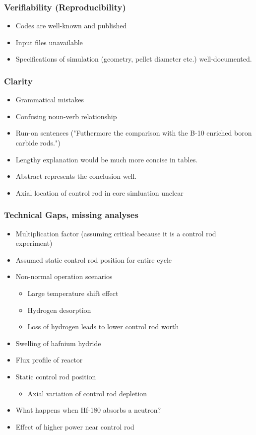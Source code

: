 \documentclass[9pt]{beamer}
\begin{document}
\begin{frame}
\frametitle{Verifiability (Reproducibility)}
\begin{itemize}
  \item Codes are well-known and published
  \item Input files unavailable
  \item Specifications of simulation (geometry, pellet diameter etc.) well-documented.
\end{itemize}
\end{frame}


\begin{frame}
\frametitle{Clarity}
\begin{itemize}
  \item Grammatical mistakes 
  \item Confusing noun-verb relationship
  \item Run-on sentences ("Futhermore the comparison with the B-10 enriched boron carbide rods.")
  \item Lengthy explanation would be much more concise in tables.
  \item Abstract represents the conclusion well.
  \item Axial location of control rod in core simluation unclear
\end{itemize}
\end{frame}


\begin{frame}
\frametitle{Technical Gaps, missing analyses}
\begin{itemize}
    \item Multiplication factor (assuming critical because it is a control rod experiment)
    \item Assumed static control rod position for entire cycle
    \item Non-normal operation scenarios
    \begin{itemize}
        \item Large temperature shift effect
        \item Hydrogen desorption
        \item Loss of hydrogen leads to lower control rod worth
    \end{itemize}
    \item Swelling of hafnium hydride
    \item Flux profile of reactor
    \item Static control rod position
    \begin{itemize}
        \item Axial variation of control rod depletion
    \end{itemize}
    \item What happens when Hf-180 absorbs a neutron?
    \item Effect of higher power near control rod
\end{itemize}
\end{frame}
\end{document}
